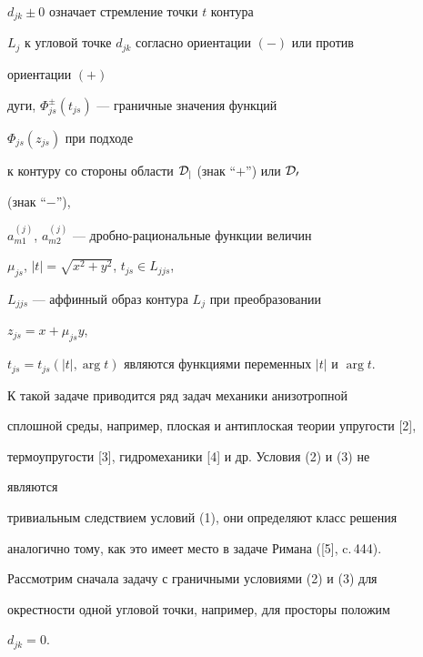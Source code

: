 $d_{jk}\pm0$ означает стремление точки $t$ контура 


$L_j$ к угловой точке $d_{jk}$ согласно ориентации $(-)$ или против 


ориентации $(+)$ 


дуги, $\Phi^\pm_{js}(t_{js})$ --- граничные значения функций


$\Phi_{js}(z_{js})$ при подходе 


к контуру со стороны области $\cal D_j$ (знак ``$+$'') или $\cal D_0$ 


(знак ``$-$''), 


$a^{(j)}_{m1}$, $a^{(j)}_{m2}$ --- дробно-рациональные функции величин 


$\mu_{js}$, $|t|=\sqrt{x^2+y^2}$, $t_{js}\in L_{jjs}$, 


$L_{jjs}$ --- аффинный образ контура $L_j$ при преобразовании 


$z_{js}=x+\mu_{js}y$, 


$t_{js}=t_{js}(|t|,\arg t)$ являются функциями переменных $|t|$ и $\arg 


t$. 


 


К такой задаче приводится ряд задач механики анизотропной 


сплошной среды, например, плоская и антиплоская теории упругости [2], 


термоупругости [3], гидромеханики [4] и др. Условия (2) и (3) не 


являются 


тривиальным следствием условий (1), они определяют класс решения 


аналогично тому, как это имеет место в задаче Римана ([5], c.\,444). 


 


Рассмотрим сначала задачу с граничными условиями (2) и (3) для 


окрестности одной угловой точки, например, для просторы положим 


$d_{jk}=0$. 


\medskip 


 


